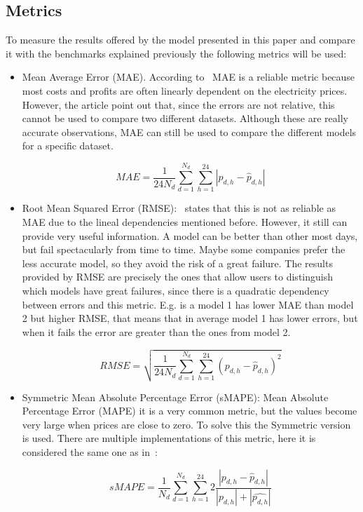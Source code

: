 \documentclass[journal]{IEEEtran}
\begin{document}
\subsection{Metrics}
\label{sec: case study, definition, metrics}
To measure the results offered by the model presented in this paper and compare it with the benchmarks explained previously the following metrics will be used:
\begin{itemize}
    \item Mean Average Error (MAE). According to~\cite{lagoForecastingDayaheadElectricity2021} MAE is a reliable metric because most costs and profits are often linearly dependent on the electricity prices. However, the article point out that, since the errors are not relative, this cannot be used to compare two different datasets. Although these are really accurate observations, MAE can still be used to compare the different models for a specific dataset.
    
    \begin{equation}
        \label{eq: mae}
        MAE = \frac{1}{24N_d}\sum_{d=1}^{N_d}\sum_{h=1}^{24}|p_{d,h} - \hat{p}_{d, h}|
    \end{equation}

    \item Root Mean Squared Error (RMSE):~\cite{lagoForecastingDayaheadElectricity2021} states that this is not as reliable as MAE due to the lineal dependencies mentioned before. However, it still can provide very useful information. A model can be better than other most days, but fail spectacularly from time to time. Maybe some companies prefer the less accurate model, so they avoid the risk of a great failure. The results provided by RMSE are precisely the ones that allow users to distinguish which models have great failures, since there is a quadratic dependency between errors and this metric. E.g. is a model 1 has lower MAE than model 2 but higher RMSE, that means that in average model 1 has lower errors, but when it fails the error are greater than the ones from model 2.
    
    \begin{equation}
        \label{eq: rmse}
        RMSE = \sqrt{\frac{1}{24N_d}\sum_{d=1}^{N_d}\sum_{h=1}^{24}(p_{d,h} - \hat{p}_{d, h})^2}
    \end{equation}

    \item Symmetric Mean Absolute Percentage Error (sMAPE): Mean Absolute Percentage Error (MAPE) it is a very common metric, but the values become very large when prices are close to zero. To solve this the Symmetric version is used. There are multiple implementations of this metric, here it is considered the same one as in~\cite{lagoForecastingDayaheadElectricity2021}:
    
    \begin{equation}
        \label{eq: smape}
        sMAPE = \frac{1}{N_d}\sum_{d=1}^{N_d}\sum_{h=1}^{24}2\frac{|p_{d,h} - \hat{p}_{d, h}|}{|p_{d,h}| +|\hat{p_{d,h}}|}
    \end{equation}

\end{itemize}
\end{document}
